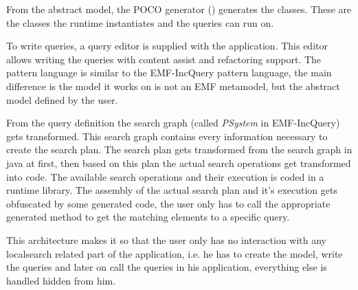 From the abstract model, the POCO generator () generates the
\CPP{} classes. These are the classes the runtime instantiates and the queries
can run on.

To write queries, a query editor is supplied with the application. This editor
allows writing the queries with content assist and refactoring support. The
pattern language is similar to the EMF-IncQuery pattern language, the main
difference is the model it works on is not an EMF metamodel, but the abstract
model defined by the user.

From the query definition the search graph (called \emph{PSystem} in
EMF-IncQuery) gets transformed. This search graph contains every information
necessary to create the search plan. The search plan gets transformed from the
search graph in java at first, then based on this plan the actual search
operations get transformed into \CPP{} code. The available search operations and
their execution is coded in a runtime library. The assembly of the actual search
plan and it's execution gets obfuscated by some generated code, the user
only has to call the appropriate generated method to get the matching elements
to a specific query.

This architecture makes it so that the user only has no interaction with any
localsearch related part of the application, i.e. he has to create the model,
write the queries and later on call the queries in his \CPP{} application,
everything else is handled hidden from him.
